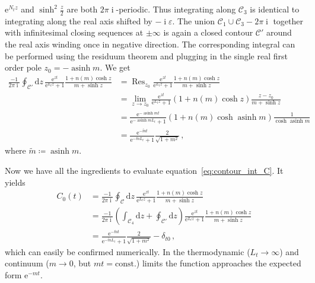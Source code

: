 \documentclass[a4paper]{article}
\DeclareMathOperator{\im}{i}
\DeclareMathOperator{\res}{Res}
\DeclareMathOperator{\asinh}{asinh}
\newcommand{\eto}[1]{\ensuremath{\mathrm{e}^{#1}}}
\newcommand{\md}{\ensuremath{\mathrm{d}}}
\begin{document}
	$\eto{N_t z}$ and $\sinh^2\frac z2$ are both $2\pi\im$-periodic. Thus integrating along $\mathcal{C}_3$ is identical to integrating along the real axis shifted by $-\im\varepsilon$. The union $\mathcal{C}_1 \cup \mathcal{C}_3-2\pi\im$ together with infinitesimal closing sequences at $\pm\infty$ is again a closed contour $\mathcal{C'}$ around the real axis winding once in negative direction. The corresponding integral can be performed using the residuum theorem and plugging in the single real first order pole $z_0=-\asinh m$. We get
	\begin{align}
	\frac{-1}{2\pi\im}\oint_{\mathcal{C'}}\md z\, \frac{\eto{z t}}{\eto{L_t z}+1}\frac{1+n(m)\cosh z}{m+\sinh z}
	&=\res_{z_0}\frac{\eto{z t}}{\eto{L_t z}+1}\frac{1+n(m)\cosh z}{m+\sinh z}\\
	&=\lim_{z\rightarrow z_0}\frac{\eto{z t}}{\eto{L_t z}+1}\left(1+n(m)\cosh z\right)\frac{z-z_0}{m+\sinh z}\\
	&= \frac{\eto{-\asinh m t}}{\eto{-\asinh m L_t}+1}\left(1+n(m)\cosh\asinh m\right)\frac{1}{\cosh\asinh m}\\
	&= \frac{\eto{-\tilde m t}}{\eto{-\tilde m L_t}+1}\frac{2}{\sqrt{1+m^2}}\,,
	\end{align}
	where $\tilde m\coloneqq \asinh m$.
	
	Now we have all the ingredients to evaluate equation~\eqref{eq:contour_int_C}. It yields
	\begin{align}
		C_0(t) &=
	\frac{-1}{2\pi\im}\oint_\mathcal{C}\md z\, \frac{\eto{z t}}{\eto{L_t z}+1}\frac{1+n(m)\cosh z}{m+\sinh z}\\
	&=\frac{-1}{2\pi\im}\left(\int_{\mathcal{C}_4}\md z+\oint_\mathcal{C'}\md z\right) \frac{\eto{z t}}{\eto{L_t z}+1}\frac{1+n(m)\cosh z}{m+\sinh z}\\
	&=\frac{\eto{-\tilde m t}}{\eto{-\tilde m L_t}+1}\frac{2}{\sqrt{1+m^2}}-\delta_{t0}\,,
	\end{align}
	which can easily be confirmed numerically. In the thermodynamic ($L_t\rightarrow\infty$) and continuum ($m\rightarrow0$, but $mt=\text{const.}$) limits the function approaches the expected form $\eto{-m t}$.
\end{document}
